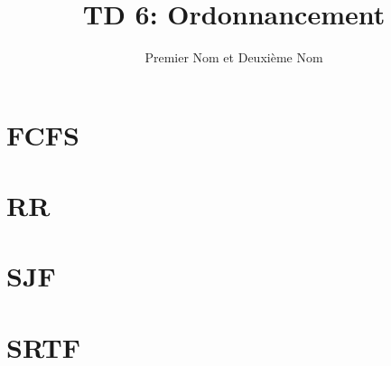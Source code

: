 \documentclass{article}
\author{Premier Nom et Deuxième Nom}
\title{TD 6: Ordonnancement}
\begin{document}
\maketitle

\section{FCFS}



\section{RR}



\section{SJF}



\section{SRTF}


\end{document}
